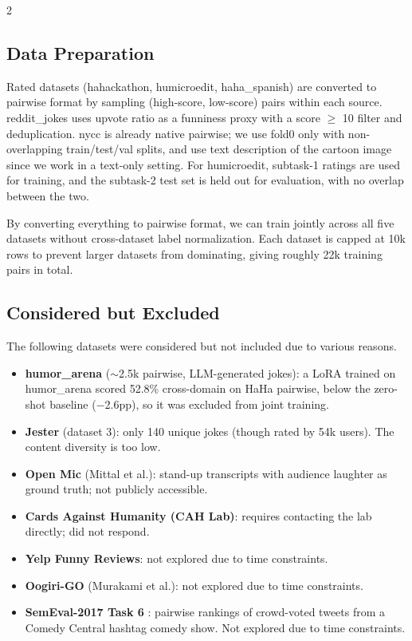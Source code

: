 \documentclass[10pt, a4paper]{article}
\begin{document}
\begin{multicols}{2}

\subsection{Data Preparation}

Rated datasets (hahackathon, humicroedit, haha\_spanish) are converted to pairwise format by sampling (high-score, low-score) pairs within each source. reddit\_jokes uses upvote ratio as a funniness proxy with a score $\geq$ 10 filter and deduplication. nycc is already native pairwise; we use fold0 only with non-overlapping train/test/val splits, and use text description of the cartoon image since we work in a text-only setting. For humicroedit, subtask-1 ratings are used for training, and the subtask-2 test set is held out for evaluation, with no overlap between the two.

By converting everything to pairwise format, we can train jointly across all five datasets without cross-dataset label normalization. Each dataset is capped at 10k rows to prevent larger datasets from dominating, giving roughly 22k training pairs in total.

\subsection{Considered but Excluded}

The following datasets were considered but not included due to various reasons.

\begin{itemize}\setlength\itemsep{0pt}
  \item \textbf{humor\_arena} ($\sim$2.5k pairwise, LLM-generated jokes): a LoRA trained on humor\_arena scored 52.8\% cross-domain on HaHa pairwise, below the zero-shot baseline ($-$2.6pp), so it was excluded from joint training.
  \item \textbf{Jester} (dataset 3): only 140 unique jokes (though rated by 54k users). The content diversity is too low.
  \item \textbf{Open Mic} (Mittal et al.): stand-up transcripts with audience laughter as ground truth; not publicly accessible.
  \item \textbf{Cards Against Humanity (CAH Lab)}: requires contacting the lab directly; did not respond.
  \item \textbf{Yelp Funny Reviews}: not explored due to time constraints.
  \item \textbf{Oogiri-GO} (Murakami et al.): not explored due to time constraints.
  \item \textbf{SemEval-2017 Task 6} \cite{potash2017}: pairwise rankings of crowd-voted tweets from a Comedy Central hashtag comedy show. Not explored due to time constraints.
\end{itemize}


\end{multicols}
\end{document}
